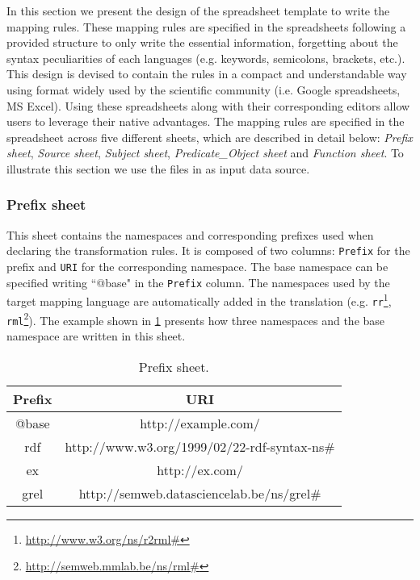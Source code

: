In this section we present the design of the spreadsheet template to write the mapping rules. 
These mapping rules are specified in the spreadsheets following a provided structure to only write the essential information, forgetting about the syntax peculiarities of each languages (e.g. keywords, semicolons, brackets, etc.).
This design is devised to contain the rules in a compact and understandable way using format widely used by the scientific community (i.e. Google spreadsheets, MS Excel). 
Using these spreadsheets along with their corresponding editors allow users to leverage their native advantages.
The mapping rules are specified in the spreadsheet across five different sheets, which are described in detail below: \textit{Prefix sheet}, \textit{Source sheet}, \textit{Subject sheet}, \textit{Predicate\_Object sheet} and \textit{Function sheet}. To illustrate this section we use the files in  as input data source.


\subsubsection{Prefix sheet} 
This sheet contains the namespaces and corresponding prefixes used when declaring the transformation rules. 
It is composed of two columns: \texttt{Prefix} for the prefix and \texttt{URI} for the corresponding namespace. The base namespace can be specified writing ``@base" in the \texttt{Prefix} column. The namespaces used by the target mapping language are automatically added in the translation (e.g. \texttt{rr}\footnote{\url{http://www.w3.org/ns/r2rml\#}}, \texttt{rml}\footnote{\url{http://semweb.mmlab.be/ns/rml\#}}).
The example shown in \cref{tab:prefix_sheet} presents how three namespaces and the base namespace are written in this sheet. 

\begin{table}[h!]
\caption{Prefix sheet.}
\label{tab:prefix_sheet}
\centering
\begin{tabular}{c|c}
\midrule
\textbf{Prefix} & \textbf{URI}                                 \\ \midrule
@base           & http://example.com/                          \\
rdf             & http://www.w3.org/1999/02/22-rdf-syntax-ns\# \\
ex              & http://ex.com/                               \\ 
grel            & http://semweb.datasciencelab.be/ns/grel\#     \\
\midrule
\end{tabular}
\end{table}


